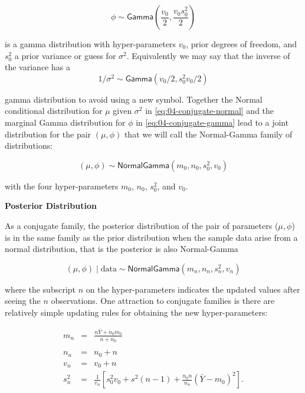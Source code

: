 \documentclass[]{book}
\theoremstyle{definition}
\theoremstyle{definition}
\theoremstyle{definition}
\theoremstyle{remark}
\begin{document}
\begin{equation}
\phi \sim \textsf{Gamma}\left(\frac{v_0}{2}, \frac{v_0 s^2_0}{2} \right)
\label{eq:04-conjugate-gamma}
\end{equation}

is a gamma distribution with hyper-parameters \(v_0\), prior degrees of
freedom, and \(s^2_0\) a prior variance or guess for \(\sigma^2\).
Equivalently we may say that the inverse of the variance has a
\[1/\sigma^2 \sim \textsf{Gamma}(v_0/2, s^2_0 v_0/2)\]

gamma distribution to avoid using a new symbol. Together the Normal
conditional distribution for \(\mu\) given \(\sigma^2\) in
\eqref{eq:04-conjugate-normal} and the marginal Gamma distribution for
\(\phi\) in \eqref{eq:04-conjugate-gamma} lead to a joint distribution for
the pair \((\mu, \phi)\) that we will call the Normal-Gamma family of
distributions:

\begin{equation}(\mu, \phi) \sim \textsf{NormalGamma}(m_0, n_0, s^2_0, v_0)
\label{eq:04-conjugate-normal-gamma}
\end{equation}

with the four hyper-parameters \(m_0\), \(n_0\), \(s^2_0\), and \(v_0\).

\textbf{Posterior Distribution}

As a conjugate family, the posterior distribution of the pair of
parameters (\(\mu, \phi\)) is in the same family as the prior
distribution when the sample data arise from a normal distribution, that
is the posterior is also Normal-Gamma

\begin{equation}
(\mu, \phi) \mid \text{data} \sim \textsf{NormalGamma}(m_n, n_n, s^2_n, v_n)
\end{equation}

where the subscript \(n\) on the hyper-parameters indicates the updated
values after seeing the \(n\) observations. One attraction to conjugate
families is there are relatively simple updating rules for obtaining the
new hyper-parameters:

\begin{eqnarray*}
m_n & = & \frac{n \bar{Y} + n_0 m_0} {n + n_0}  \\
& \\
n_n & = & n_0 + n  \\
v_n & = & v_0 + n  \\
s^2_n & =  & \frac{1}{v_n}\left[s^2_0 v_0 + s^2 (n-1) + \frac{n_0 n}{n_n} (\bar{Y} - m_0)^2 \right]. 
\end{eqnarray*}
\end{document}
